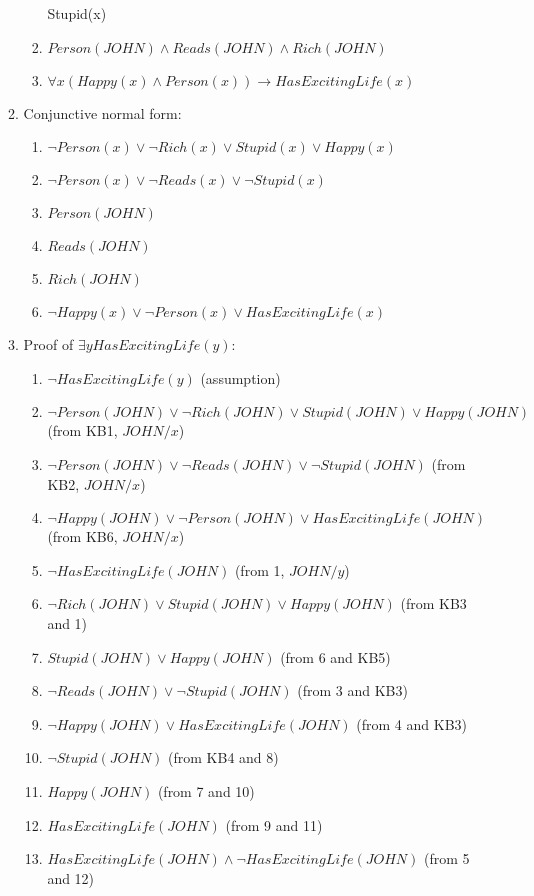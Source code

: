 \documentclass[11pt]{article}
\begin{document}
\begin{enumerate}[label=\bfseries Question \arabic*:]
\begin{enumerate}
\begin{enumerate}[label=\arabic*.]
      Stupid(x) \)
    \item \(Person(JOHN) \land Reads(JOHN) \land Rich(JOHN) \)
    \item
      \(\forall x (Happy(x) \land Person(x)) \rightarrow
      HasExcitingLife(x) \)
    \end{enumerate}
  \item Conjunctive normal form:
    \begin{enumerate}[label=KB\arabic*.]
    \item
      \(\lnot Person(x) \lor \lnot Rich(x) \lor Stupid(x) \lor
      Happy(x)\)
    \item \(\lnot Person(x) \lor \lnot Reads(x) \lor \lnot Stupid(x)\)
    \item \(Person(JOHN)\)
    \item \(Reads(JOHN)\)
    \item \(Rich(JOHN)\)
    \item
      \(\lnot Happy(x) \lor \lnot Person(x) \lor HasExcitingLife(x)\)
    \end{enumerate}
\item Proof of \(\exists y HasExcitingLife(y)\):
  \begin{enumerate}[label=\arabic*.]
  \item \( \lnot HasExcitingLife(y)\) (assumption)
  \item
    \(\lnot Person(JOHN) \lor \lnot Rich(JOHN) \lor Stupid(JOHN) \lor
    Happy(JOHN)\) (from KB1, \(JOHN / x\))
  \item
    \(\lnot Person(JOHN) \lor \lnot Reads(JOHN) \lor \lnot
    Stupid(JOHN)\) (from KB2, \(JOHN / x\))
  \item
    \(\lnot Happy(JOHN) \lor \lnot Person(JOHN) \lor
    HasExcitingLife(JOHN)\) (from KB6, \(JOHN /x\))
  \item \( \lnot HasExcitingLife(JOHN)\) (from 1, \(JOHN / y\))
  \item \(\lnot Rich(JOHN) \lor Stupid(JOHN) \lor Happy(JOHN)\)
    (from KB3 and 1)
  \item \(Stupid(JOHN) \lor Happy(JOHN)\) (from 6 and KB5)
  \item \(\lnot Reads(JOHN) \lor \lnot Stupid(JOHN)\) (from 3 and KB3)
  \item \(\lnot Happy(JOHN) \lor HasExcitingLife(JOHN)\)
    (from 4 and KB3)
  \item \(\lnot Stupid(JOHN)\) (from KB4 and 8)
  \item \(Happy(JOHN)\) (from 7 and 10)
  \item \(HasExcitingLife(JOHN)\) (from 9 and 11)
  \item \(HasExcitingLife(JOHN) \land \lnot HasExcitingLife(JOHN)\)
    (from 5 and 12)
 
  \end{enumerate}
  \end{enumerate}
\end{enumerate}
\end{document}
